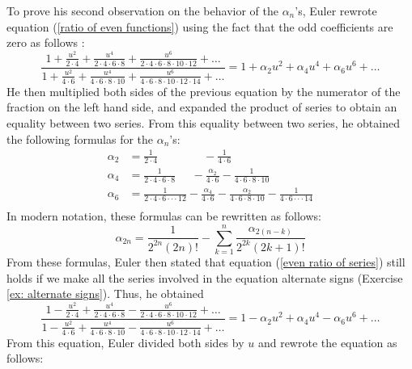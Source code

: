 To prove his second observation on the behavior of the $\alpha_n$'s, Euler rewrote equation (\ref{ratio of even functions}) using the fact that the odd coefficients are zero as follows :
\begin{equation} \label{even ratio of series}
    \frac{1 + \frac{u^2}{2\cdot 4} + \frac{u^4}{2\cdot 4 \cdot 6 \cdot 8} + \frac{u^6}{2\cdot 4 \cdot 6 \cdot 8 \cdot 10 \cdot 12} + \dots}{1 + \frac{u^2}{4 \cdot 6} + \frac{u^4}{4\cdot 6 \cdot 8 \cdot 10} + \frac{u^6}{4 \cdot 6 \cdot 8 \cdot 10 \cdot 12 \cdot 14} + \dots} = 1 + \alpha_2 u^2 + \alpha_4 u^4 + \alpha_6 u^6 + \dots
\end{equation}
He then multiplied both sides of the previous equation by the numerator of the fraction on the left hand side, and expanded the product of series to obtain an equality between two series. From this equality between two series, he obtained the following formulas for the $\alpha_n$'s:
\begin{align*}
    \alpha_2 &= \frac{1}{2 \cdot 4} \qquad \qquad - \frac{1}{4\cdot 6} \\
    \alpha_4 &= \frac{1}{2 \cdot 4 \cdot 6 \cdot 8} \quad \ \, - \frac{\alpha_2}{4\cdot 6}  - \frac{1}{4 \cdot 6 \cdot 8 \cdot 10}\\
    \alpha_6 &= \frac{1}{2 \cdot 4 \cdot 6 \cdot \cdot \cdot 12} - \frac{\alpha_4}{4\cdot 6}  - \frac{\alpha_2}{4 \cdot 6 \cdot 8 \cdot 10} - \frac{1}{4 \cdot 6 \cdot \cdot \cdot 14}\\
\end{align*}
In modern notation, these formulas can be rewritten as follows:
\begin{equation} \label{recursive formula alpha}
    \alpha_{2n} = \frac{1}{2^{2n}(2n)!} - \sum_{k=1}^{n}\frac{\alpha_{2(n-k)}}{2^{2k}(2k+1)!}
\end{equation}
From these formulas, Euler then stated that equation (\ref{even ratio of series}) still holds if we make all the series involved in the equation alternate signs (Exercise \ref{ex: alternate signs}). Thus, he obtained 
\begin{equation}
    \frac{1 - \frac{u^2}{2\cdot 4} + \frac{u^4}{2\cdot 4 \cdot 6 \cdot 8} - \frac{u^6}{2\cdot 4 \cdot 6 \cdot 8 \cdot 10 \cdot 12} + \dots}{1 - \frac{u^2}{4 \cdot 6} + \frac{u^4}{4\cdot 6 \cdot 8 \cdot 10} - \frac{u^6}{4 \cdot 6 \cdot 8 \cdot 10 \cdot 12 \cdot 14} + \dots} = 1 - \alpha_2 u^2 + \alpha_4 u^4 - \alpha_6 u^6 + \dots
\end{equation}
From this equation, Euler divided both sides by $u$ and rewrote the equation as follows:
